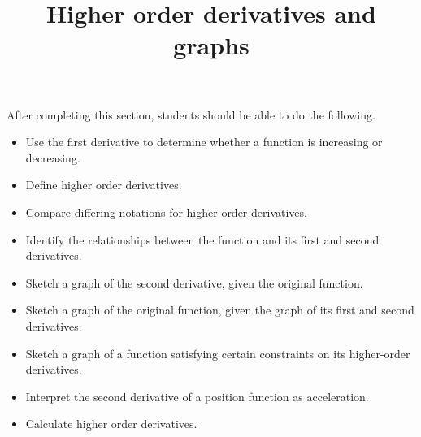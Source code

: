 \documentclass{ximera}
\title{Higher order derivatives and graphs}
\begin{document}
\begin{abstract}
\end{abstract}

\maketitle

\begin{sectionOutcomes}

After completing this section, students should be able to do the following.


\begin{itemize}
\item Use the first derivative to determine whether a function is increasing or decreasing.
\item Define higher order derivatives.
\item Compare differing notations for higher order derivatives.
\item Identify the relationships between the function and its first and second derivatives.
\item Sketch a graph of the second derivative, given the original function.
\item Sketch a graph of the original function, given the graph of its first and second derivatives.
\item Sketch a graph of a function satisfying certain constraints on its higher-order derivatives.
\item Interpret the second derivative of a position function as acceleration.
\item Calculate higher order derivatives.

\end{itemize}
\end{sectionOutcomes}
\end{document}
